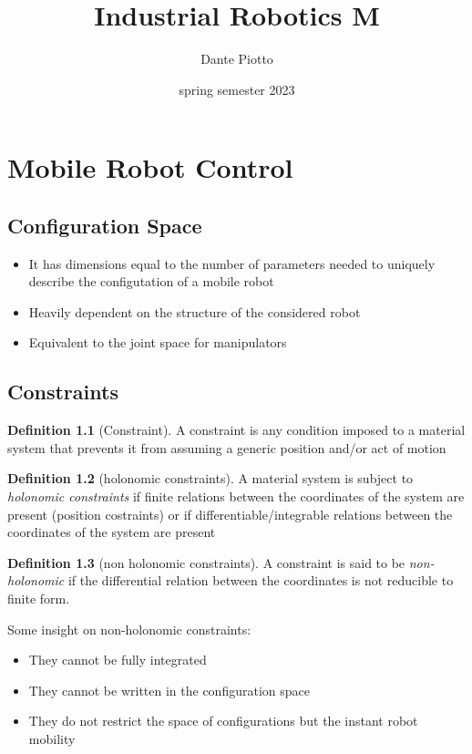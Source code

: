 \documentclass{book}
\title{Industrial Robotics M}
\author{Dante Piotto}
\date{spring semester 2023}
\theoremstyle{definition}
\newtheorem{definition}{Definition}[section]
\theoremstyle{remark}
\theoremstyle{remark}
\begin{document}
\chapter{Mobile Robot Control}
\section{Configuration Space}
\begin{itemize}
    \item It has dimensions equal to the number of parameters needed to uniquely describe the configutation of a mobile robot 
    \item Heavily dependent on the structure of the considered robot 
    \item Equivalent to the joint space for manipulators
\end{itemize}

\section{Constraints}
\begin{definition}[Constraint]
    A constraint is any condition imposed to a material system that prevents it from assuming a generic position and/or act of motion
\end{definition}
\begin{definition}[holonomic constraints]
    A material system is subject to \emph{holonomic constraints} if finite relations between the coordinates of the system are present (position costraints) or if differentiable/integrable relations between the coordinates of the system are present
\end{definition}
\begin{definition}[non holonomic constraints]
    A constraint is said to be \emph{non-holonomic} if the differential relation between the coordinates is not reducible to finite form.
\end{definition}
Some insight on non-holonomic constraints: 
\begin{itemize}
    \item They cannot be fully integrated 
    \item They cannot be written in the configuration space 
    \item They do not restrict the space of configurations but the instant robot mobility
\end{itemize}
\end{document}
